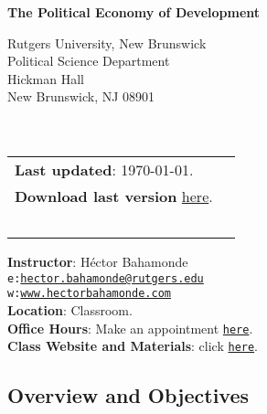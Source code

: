 \documentclass[letterpaper]{article}
\def\name{The Political Economy of Development}
\begin{document}

\centerline{\huge \bf \name}

\vspace{0.25in}

\begin{minipage}{0.45\linewidth}
  Rutgers University, New Brunswick \\
  Political Science Department \\
  Hickman Hall \\
  New Brunswick, NJ 08901\\
  \\
  \\

\end{minipage}
\hspace{4cm}\begin{minipage}{0.45\linewidth}
  \begin{tabular}{ll}
{\bf Last updated}: \today. \\
 {\bf Download last version} \href{https://github.com/hbahamonde/Pol_Econ_Dev_Grad/raw/master/Pol_Econ_Dev_Syllabus_GRAD.pdf}{here}.
    \\
    \\
    \\
    \\
    \\
    \\
  \end{tabular}
\end{minipage}

\vspace{-5mm}
{\bf Instructor}: H\'ector Bahamonde\\
\texttt{e:}\href{mailto:hector.bahamonde@rutgers.edu}{\texttt{hector.bahamonde@rutgers.edu}}\\
\texttt{w:}\href{http://www.hectorbahamonde.com}{\texttt{www.hectorbahamonde.com}}\\
{\bf Location}: Classroom.\\
{\bf Office Hours}: Make an appointment \href{https://calendly.com/bahamonde/officehours}{\texttt{here}}.\\
{\bf Class Website and Materials}: click \href{https://github.com/hbahamonde/Pol_Econ_Dev_Grad}{\texttt{here}}.

\subsection*{Overview and Objectives}
\end{document}
